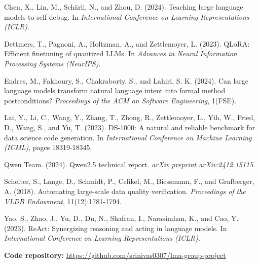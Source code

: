 \documentclass[11pt]{article}
\begin{document}
Chen, X., Lin, M., Schärli, N., and Zhou, D. (2024). Teaching large
language models to self-debug. In \emph{International Conference on
Learning Representations (ICLR)}.

Dettmers, T., Pagnoni, A., Holtzman, A., and Zettlemoyer, L. (2023).
QLoRA: Efficient finetuning of quantized LLMs. In \emph{Advances in
Neural Information Processing Systems (NeurIPS)}.

Endres, M., Fakhoury, S., Chakraborty, S., and Lahiri, S. K. (2024). Can
large language models transform natural language intent into formal
method postconditions? \emph{Proceedings of the ACM on Software
Engineering}, 1(FSE).

Lai, Y., Li, C., Wang, Y., Zhang, T., Zhong, R., Zettlemoyer, L., Yih,
W., Fried, D., Wang, S., and Yu, T. (2023). DS-1000: A natural and
reliable benchmark for data science code generation. In
\emph{International Conference on Machine Learning (ICML)}, pages
18319-18345.

Qwen Team. (2024). Qwen2.5 technical report. \emph{arXiv preprint
arXiv:2412.15115}.

Schelter, S., Lange, D., Schmidt, P., Celikel, M., Biessmann, F., and
Grafberger, A. (2018). Automating large-scale data quality verification.
\emph{Proceedings of the VLDB Endowment}, 11(12):1781-1794.

Yao, S., Zhao, J., Yu, D., Du, N., Shafran, I., Narasimhan, K., and Cao,
Y. (2023). ReAct: Synergizing reasoning and acting in language models.
In \emph{International Conference on Learning Representations (ICLR)}.

\textbf{Code repository:}
\url{https://github.com/srinivas0307/lma-group-project}
\end{document}
